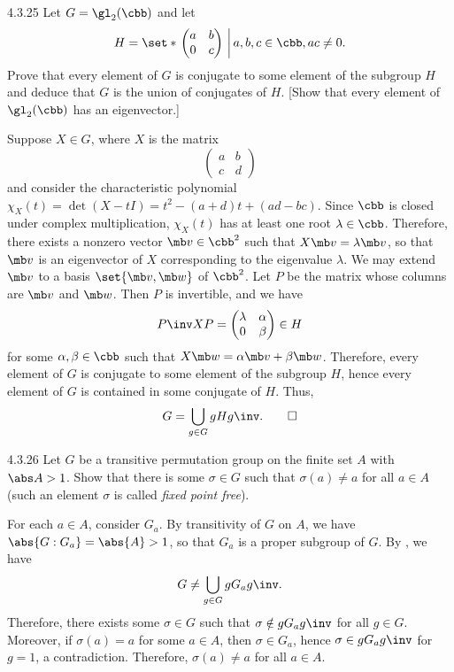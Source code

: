 \begin{exercise}{4.3.25}
	Let $G = \gl_2(\cbb)$ and let
	\[
		H = \set*{\left.
		\begin{pmatrix}
			a & b \\
			0 & c
		\end{pmatrix}~\right| a, b, c \in \cbb, ac \neq 0
		}.
	\]
	Prove that every element of $G$ is conjugate to some element of the subgroup $H$ and deduce that $G$ is the union of conjugates of $H$. [Show that every element of $\gl_2(\cbb)$ has an eigenvector.]
\end{exercise}

\begin{sol}
	Suppose $X \in G$, where $X$ is the matrix
	\[
		\begin{pmatrix}
			a & b \\
			c & d
		\end{pmatrix}
	\]
	and consider the characteristic polynomial $\chi_X(t) = \det(X - tI) = t^2 - (a + d)t + (ad - bc)$.
	Since $\cbb$ is closed under complex multiplication, $\chi_X(t)$ has at least one root $\lambda \in \cbb$.
	Therefore, there exists a nonzero vector $\mb v \in \cbb^2$ such that $X\mb v = \lambda \mb v$, so that $\mb v$ is an eigenvector of $X$ corresponding to the eigenvalue $\lambda$.
	We may extend $\mb v$ to a basis $\set{\mb v, \mb w}$ of $\cbb^2$.
	Let $P$ be the matrix whose columns are $\mb v$ and $\mb w$.
	Then $P$ is invertible, and we have
	\[
		P\inv XP = \begin{pmatrix}
			\lambda & \alpha \\
			0 & \beta
		\end{pmatrix} \in H
	\]
	for some $\alpha, \beta \in \cbb$ such that $X\mb w = \alpha \mb v + \beta \mb w$.
	Therefore, every element of $G$ is conjugate to some element of the subgroup $H$, hence every element of $G$ is contained in some conjugate of $H$.
	Thus,
	\[
		G = \bigcup_{g \in G} gHg\inv. \qedhere
	\]
\end{sol}

\begin{exercise}{4.3.26}
	Let $G$ be a transitive permutation group on the finite set $A$ with $\abs A > 1$.
	Show that there is some $\sigma \in G$ such that $\sigma(a) \neq a$ for all $a \in A$ (such an element $\sigma$ is called \emph{fixed point free}).
\end{exercise}

\begin{sol}
	For each $a \in A$, consider $G_a$.
	By transitivity of $G$ on $A$, we have $\abs{G : G_a} = \abs{A} > 1$, so that $G_a$ is a proper subgroup of $G$.
	By , we have
	\[
		G \neq \bigcup_{g \in G} gG_ag\inv.
	\]
	Therefore, there exists some $\sigma \in G$ such that $\sigma \notin gG_ag\inv$ for all $g \in G$.
	Moreover, if $\sigma(a) = a$ for some $a \in A$, then $\sigma \in G_a$, hence $\sigma \in gG_ag\inv$ for $g = 1$, a contradiction.
	Therefore, $\sigma(a) \neq a$ for all $a \in A$.
\end{sol}

